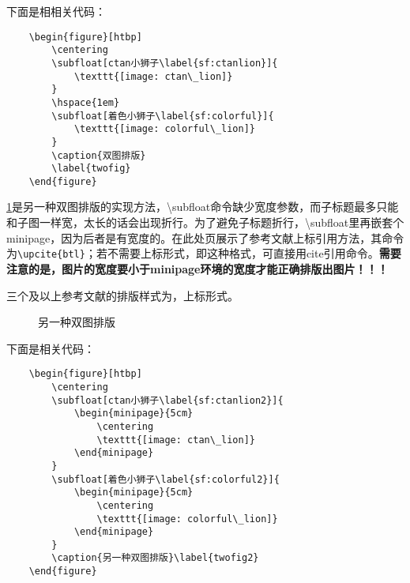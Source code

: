 下面是相相关代码：
\begin{verbatim}
	\begin{figure}[htbp]
		\centering
		\subfloat[ctan小狮子\label{sf:ctanlion}]{
			\texttt{[image: ctan\_lion]}
		}
		\hspace{1em}
		\subfloat[着色小狮子\label{sf:colorful}]{
			\texttt{[image: colorful\_lion]}
		}
		\caption{双图排版}
		\label{twofig}
	\end{figure}
\end{verbatim}

\cref{twofig2}是另一种双图排版的实现方法，\textbackslash subfloat命令缺少宽度参数，而子标题最多只能和子图一样宽，太长的话会出现折行。为了避免子标题折行，\textbackslash subfloat里再嵌套个minipage，因为后者是有宽度的。在此处页展示了参考文献上标引用方法，其命令为\verb|\upcite{btl}|；若不需要上标形式，即\cite{btl}这种格式，可直接用cite引用命令。\textbf{需要注意的是，图片的宽度要小于minipage环境的宽度才能正确排版出图片！！！}

三个及以上参考文献的排版样式为\cite{lhy,hw,btl}，上标形式。


\begin{figure}[htbp]
	\centering
	\caption{另一种双图排版}\label{twofig2}
\end{figure}


下面是相关代码：
\begin{verbatim}
	\begin{figure}[htbp]
		\centering
		\subfloat[ctan小狮子\label{sf:ctanlion2}]{
			\begin{minipage}{5cm}
				\centering
				\texttt{[image: ctan\_lion]}
			\end{minipage}
		}
		\subfloat[着色小狮子\label{sf:colorful2}]{
			\begin{minipage}{5cm}
				\centering
				\texttt{[image: colorful\_lion]}
			\end{minipage}
		}
		\caption{另一种双图排版}\label{twofig2}
	\end{figure}
\end{verbatim}


